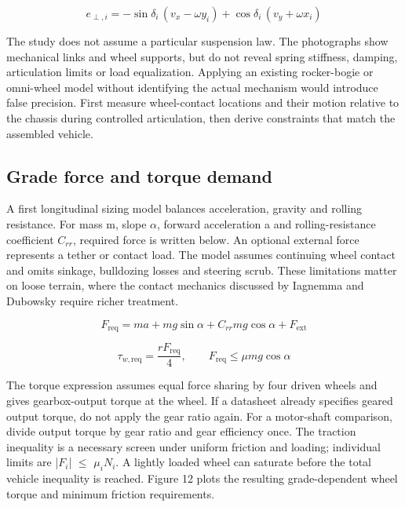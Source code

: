 \documentclass[11pt,a4paper]{article}
\begin{document}
\begin{equation}
\label{eq:3}
e_{\perp,i}=-\sin\delta_i\,(v_x-\omega y_i)+\cos\delta_i\,(v_y+\omega x_i)
\end{equation}

The study does not assume a particular suspension law. The photographs show mechanical links and wheel supports, but do not reveal spring stiffness, damping, articulation limits or load equalization. Applying an existing rocker-bogie or omni-wheel model without identifying the actual mechanism would introduce false precision. First measure wheel-contact locations and their motion relative to the chassis during controlled articulation, then derive constraints that match the assembled vehicle.

\FloatBarrier

\subsection{Grade force and torque demand}\label{sec:5.3}

A first longitudinal sizing model balances acceleration, gravity and rolling resistance. For mass m, slope \ensuremath{\alpha}, forward acceleration a and rolling-resistance coefficient \(C_{rr}\), required force is written below. An optional external force represents a tether or contact load. The model assumes continuing wheel contact and omits sinkage, bulldozing losses and steering scrub. These limitations matter on loose terrain, where the contact mechanics discussed by Iagnemma and Dubowsky \citep{iagnemma2004_9f7418} require richer treatment.

\begin{equation}
\label{eq:4}
F_{\mathrm{req}}=ma+mg\sin\alpha+C_{rr}mg\cos\alpha+F_{\mathrm{ext}}
\end{equation}

\begin{equation}
\label{eq:5}
\tau_{w,\mathrm{req}}=\frac{rF_{\mathrm{req}}}{4},\qquad F_{\mathrm{req}}\leq\mu mg\cos\alpha
\end{equation}

The torque expression assumes equal force sharing by four driven wheels and gives gearbox-output torque at the wheel. If a datasheet already specifies geared output torque, do not apply the gear ratio again. For a motor-shaft comparison, divide output torque by gear ratio and gear efficiency once. The traction inequality is a necessary screen under uniform friction and loading; individual limits are |\(F_i\)| \ensuremath{\leq} \(\mu_i N_i\). A lightly loaded wheel can saturate before the total vehicle inequality is reached. Figure 12 plots the resulting grade-dependent wheel torque and minimum friction requirements.
\end{document}
